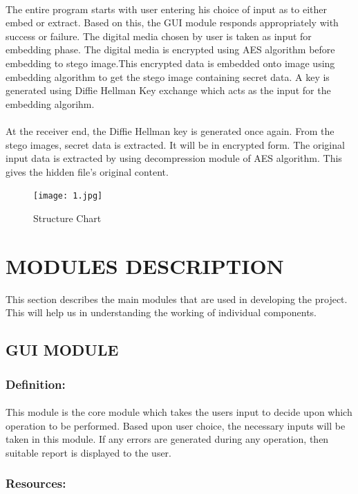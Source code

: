 \documentclass[12pt]{report}
\begin{document}
\paragraph{} The entire program starts with user entering his choice of input as to either embed or extract. Based on this, the GUI module responds appropriately with success or failure. The digital media chosen by user is taken as input for embedding phase. The digital media is encrypted using AES algorithm before embedding to stego image.This encrypted data is embedded onto image using embedding algorithm to get the stego image containing secret data. A key is generated using Diffie Hellman Key exchange which acts as the input for the embedding algorihm.
\paragraph{} At the receiver end, the Diffie Hellman key is generated once again. From the stego images, secret data is extracted. It will be in encrypted form. The original input data is extracted by using decompression module of AES algorithm. This gives the hidden file's original content.
\begin{figure}[h!]
	\centering
		\texttt{[image: 1.jpg]}
		\caption{Structure Chart}
\end{figure} 
\pagebreak
\section{MODULES DESCRIPTION}
This section describes the main modules that are used in developing the project. This will help us in understanding the working of individual components. 
\subsection{GUI MODULE}
\subsubsection{Definition:} 
\paragraph{} This module is the core module which takes the users input to decide upon which operation to be performed. Based upon user choice, the necessary inputs will be taken in this module. If any errors are generated during any operation, then suitable report is displayed to the user.
\subsubsection{Resources:} 
\end{document}
